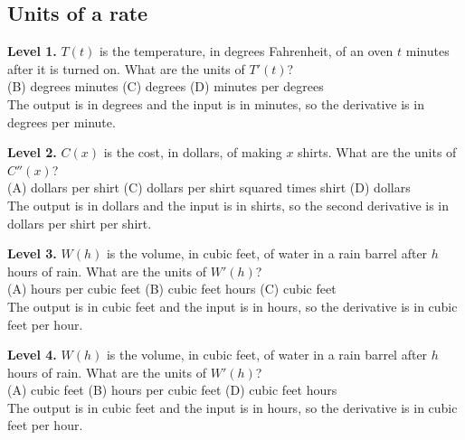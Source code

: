 \documentclass[11pt]{article}
\begin{document}
\subsection*{Units of a rate}
\noindent\textbf{Level 1.} $T(t)$ is the temperature, in degrees Fahrenheit, of an oven $t$ minutes after it is turned on. What are the units of $T'(t)$?\\  \quad (B) degrees minutes \quad (C) degrees \quad (D) minutes per degrees\\  \quad The output is in degrees and the input is in minutes, so the derivative is in degrees per minute.\par\medskip
\noindent\textbf{Level 2.} $C(x)$ is the cost, in dollars, of making $x$ shirts. What are the units of $C''(x)$?\\ (A) dollars per shirt \quad {} \quad (C) dollars per shirt squared times shirt \quad (D) dollars\\  \quad The output is in dollars and the input is in shirts, so the second derivative is in dollars per shirt per shirt.\par\medskip
\noindent\textbf{Level 3.} $W(h)$ is the volume, in cubic feet, of water in a rain barrel after $h$ hours of rain. What are the units of $W'(h)$?\\ (A) hours per cubic feet \quad (B) cubic feet hours \quad (C) cubic feet \quad {}\\  \quad The output is in cubic feet and the input is in hours, so the derivative is in cubic feet per hour.\par\medskip
\noindent\textbf{Level 4.} $W(h)$ is the volume, in cubic feet, of water in a rain barrel after $h$ hours of rain. What are the units of $W'(h)$?\\ (A) cubic feet \quad (B) hours per cubic feet \quad {} \quad (D) cubic feet hours\\  \quad The output is in cubic feet and the input is in hours, so the derivative is in cubic feet per hour.\par\medskip
\end{document}
